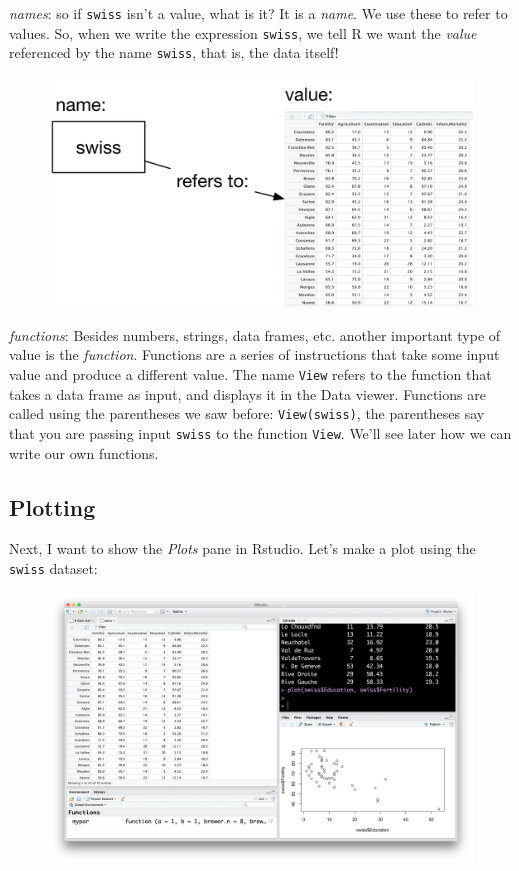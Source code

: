 \documentclass[12pt,]{book}
\theoremstyle{definition}
\theoremstyle{definition}
\theoremstyle{remark}
\begin{document}
\emph{names}: so if \texttt{swiss} isn't a value, what is it? It is a
\emph{name}. We use these to refer to values. So, when we write the
expression \texttt{swiss}, we tell R we want the \emph{value} referenced
by the name \texttt{swiss}, that is, the data itself!

\begin{figure}
\centering
\includegraphics{img/names_values.png}
\caption{}
\end{figure}

\emph{functions}: Besides numbers, strings, data frames, etc. another
important type of value is the \emph{function}. Functions are a series
of instructions that take some input value and produce a different
value. The name \texttt{View} refers to the function that takes a data
frame as input, and displays it in the Data viewer. Functions are called
using the parentheses we saw before: \texttt{View(swiss)}, the
parentheses say that you are passing input \texttt{swiss} to the
function \texttt{View}. We'll see later how we can write our own
functions.

\subsection{Plotting}\label{plotting}

Next, I want to show the \emph{Plots} pane in Rstudio. Let's make a plot
using the \texttt{swiss} dataset:

\begin{figure}
\centering
\includegraphics{img/rstudio_plot_swiss.png}
\caption{}
\end{figure}
\end{document}
